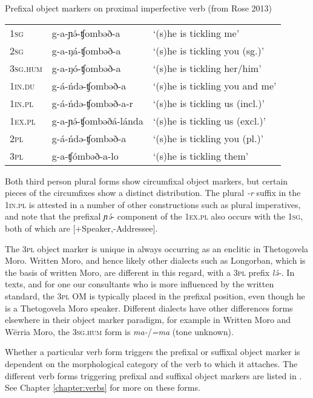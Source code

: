 \ea Prefixal object markers on proximal imperfective verb (from Rose 2013)\\
\begin{tabular}[t]{lll}
1\textsc{sg} & g-a-ɲə́-ʧombəð-a & `(s)he is tickling me'\\
2\textsc{sg} & g-a-ŋá-ʧombəð-a & `(s)he is tickling you ({sg}.)'\\
3\textsc{sg.hum} & g-a-ŋó-ʧombəð-a & `(s)he is tickling her/him'\\
1\textsc{in}.\textsc{du} & g-á-ńdə-ʧombəð-a & `(s)he is tickling you and me'\\
1\textsc{in}.\textsc{pl} & g-á-ńdə-ʧombəð-a-r & `(s)he is tickling us (incl.)'\\
1\textsc{ex}.\textsc{pl} & g-a-ɲə́-ʧombəðá-lánda & `(s)he is tickling us (excl.)'\\
2\textsc{pl} & g-á-ńdə-ʧombəð-a & `(s)he is tickling you (pl.)'\\
3\textsc{pl} & g-a-ʧómbəð-a-lo & `(s)he is tickling them'\\
\end{tabular}
\z
Both third person plural forms show circumfixal object markers, but certain pieces of the circumfixes show a distinct distribution. The plural \textit{-r} suffix in the 1\textsc{in}.\textsc{pl} is attested in a number of other constructions such as plural imperatives, and note that the prefixal \textit{ɲə́}- component of the 1\textsc{ex}.\textsc{pl} also occurs with the 1\textsc{sg}, both of which are [+Speaker,-Addressee]. 

The 3\textsc{pl} object marker is unique in always occurring as an enclitic in Thetogovela Moro. Written Moro, and hence likely other dialects such as Longorban, which is the basis of written Moro, are different in this regard, with a 3\textsc{pl} prefix \textit{lə́-}. In texts, and for one our consultants who is more influenced by the written standard, the 3\textsc{pl} OM is typically placed in the prefixal position, even though he is a Thetogovela Moro speaker. Different dialects have other differences forms elsewhere in their object marker paradigm, for example in Written Moro and Wërria Moro, the 3\textsc{sg}.\textsc{hum} form is \textit{ma-}/\textit{=ma} (tone unknown).

Whether a particular verb form triggers the prefixal or suffixal object marker is dependent on the morphological category of the verb to which it attaches. The different verb forms triggering prefixal and suffixal object markers are listed in . See Chapter \ref{chapter:verbs} for more on these forms.

